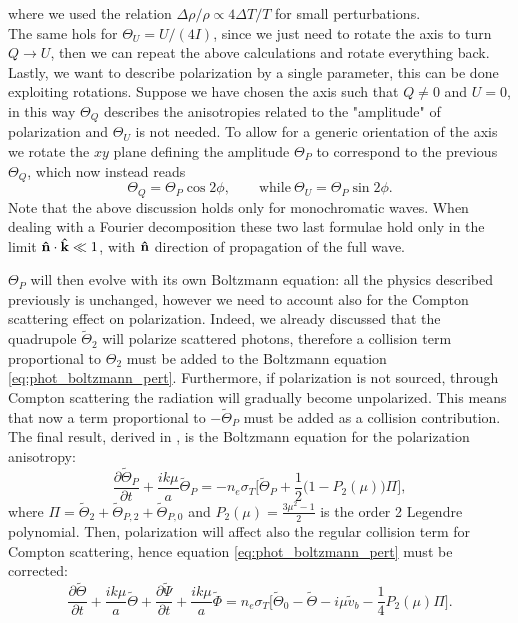 where we used the relation $\Delta\rho/\rho\propto4\Delta T/T$ for small perturbations.\\The same hols for $\Theta_U=U/(4I)$, since we just need to rotate the axis to turn $Q\rightarrow U$, then we can repeat the above calculations and rotate everything back.\\ Lastly, we want to describe polarization by a single parameter, this can be done exploiting rotations. Suppose we have chosen the axis such that $Q\neq0$ and $U=0$, in this way $\Theta_Q$ describes the anisotropies related to the "amplitude" of polarization and $\Theta_U$ is not needed. To allow for a generic orientation of the axis we rotate the $xy$ plane defining the amplitude $\Theta_P$ to correspond to the previous $\Theta_Q$, which now instead reads
$$\Theta_Q=\Theta_P\cos2\phi,\qquad\text{while}\  \Theta_U=\Theta_P\sin2\phi.$$
Note that the above discussion holds only for monochromatic waves. When dealing with a Fourier decomposition these two last formulae hold only in the limit $\mathbf{\hat{n}}\cdot\mathbf{\hat{k}}\ll1$, with $\mathbf{\hat{n}}$ direction of propagation of the full wave.

$\Theta_P$ will then evolve with its own Boltzmann equation:
all the physics described previously is unchanged, however we need to account also for the Compton scattering effect on polarization. Indeed, we already discussed that the quadrupole $\tilde{\Theta}_2$ will polarize scattered photons, therefore a collision term proportional to $\Theta_2$ must be added to the Boltzmann equation \eqref{eq:phot_boltzmann_pert}. Furthermore, if polarization is not sourced, through Compton scattering the radiation will gradually become unpolarized. This means that now a term proportional to $-\tilde{\Theta}_P$ must be added as a collision contribution. The final result, derived in \cite{10.1093/mnras/226.3.655}, is the Boltzmann equation for the polarization anisotropy:
\begin{equation}\label{eq:ThetaP_Boltzmann}
    \frac{\partial \tilde\Theta_P}{\partial t}+\frac{ik\mu}{a}\tilde\Theta_P=-n_e\sigma_T\bigg[\tilde\Theta_{P}+\frac{1}{2}\bigg(1-P_2(\mu)\bigg)\Pi\bigg],
\end{equation}
where $\Pi=\tilde\Theta_2+\tilde\Theta_{P,2}+\tilde\Theta_{P,0}$ and $P_2(\mu)=\frac{3\mu^2-1}{2}$ is the order 2 Legendre polynomial.
Then, polarization will affect also the regular collision term for Compton scattering, hence equation \eqref{eq:phot_boltzmann_pert} must be corrected:
\begin{equation}\label{eq:phot_boltzmann_pert_pol}
    \frac{\partial \tilde\Theta}{\partial t} +\frac{ik\mu}{a}\tilde\Theta+\frac{\partial \tilde\Psi}{\partial t}+\frac{ik\mu}{a}\tilde\Phi=n_e \sigma_T\Bigg[\tilde\Theta_0-\tilde\Theta-i\mu\tilde v_b-\frac{1}{4}P_2(\mu)\Pi\Bigg].
\end{equation}
